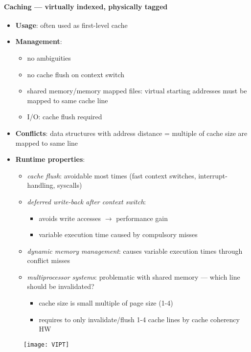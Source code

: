 \paragraph{Caching --- virtually indexed, physically tagged}
\begin{itemize}
  \item \textbf{Usage}: often used as first-level cache
  \item \textbf{Management}:
  \begin{itemize}
    \item no ambiguities
    \item no cache flush on context switch
    \item shared memory/memory mapped files: virtual starting addresses must be mapped to same cache line
    \item I/O: cache flush required
  \end{itemize}
  \item \textbf{Conflicts}: data structures with address distance = multiple of cache size are mapped to same line
  \item \textbf{Runtime properties}:
  \begin{itemize}
    \item \emph{cache flush}: avoidable most times (fast context switches, interrupt-handling, syscalls)
    \item \emph{deferred write-back after context switch}:
    \begin{itemize}
      \item avoids write accesses $ \to $ performance gain
      \item variable execution time caused by compulsory misses
    \end{itemize}
    \item \emph{dynamic memory management}: causes variable execution times through conflict misses
    \item \emph{multiprocessor systems}: problematic with shared memory --- which line should be invalidated?
    \begin{itemize}
      \item cache size is small multiple of page size (1-4)
      \item requires to only invalidate/flush 1-4 cache lines by cache coherency HW
    \end{itemize}
  \end{itemize}
\end{itemize}
\begin{figure}[h]\centering\label{VIPT}\texttt{[image: VIPT]}\end{figure}


